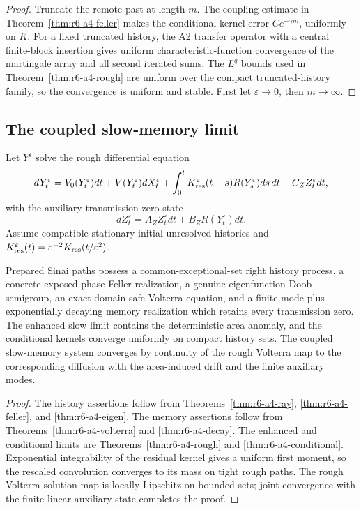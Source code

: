 \begin{proof}
Truncate the remote past at length \(m\).  The coupling estimate in
Theorem~\ref{thm:r6-a4-feller} makes the conditional-kernel error
\(Ce^{-\gamma m}\), uniformly on \(K\).  For a fixed truncated history, the
A2 transfer operator with a central finite-block insertion gives uniform
characteristic-function convergence of the martingale array and all second
iterated sums.  The \(L^q\) bounds used in
Theorem~\ref{thm:r6-a4-rough} are uniform over the compact truncated-history
family, so the convergence is uniform and stable.  First let
\(\varepsilon\to0\), then \(m\to\infty\).
\end{proof}

\subsection{The coupled slow-memory limit}

Let \(Y^\varepsilon\) solve the rough differential equation
\[
dY_t^\varepsilon=V_0(Y_t^\varepsilon)dt+
V(Y_t^\varepsilon)dX_t^\varepsilon+
\int_0^tK_{\rm res}^\varepsilon(t-s)R(Y_s^\varepsilon)ds\,dt
+C_ZZ_t^\varepsilon dt,
\]
with the auxiliary transmission-zero state
\[
dZ_t^\varepsilon=A_ZZ_t^\varepsilon dt+B_ZR(Y_t^\varepsilon)dt.
\]
Assume compatible stationary initial unresolved histories and
\(K_{\rm res}^\varepsilon(t)=\varepsilon^{-2}
K_{\rm res}(t/\varepsilon^2)\).

\begin{theorem}
\label{thm:r6-a4-main}
Prepared Sinai paths possess a common-exceptional-set right history process,
a concrete exposed-phase Feller realization, a genuine eigenfunction Doob
semigroup, an exact domain-safe Volterra equation, and a finite-mode plus
exponentially decaying memory realization which retains every transmission
zero.  The enhanced slow limit contains the deterministic area anomaly, and
the conditional kernels converge uniformly on compact history sets.  The
coupled slow-memory system converges by continuity of the rough Volterra map
to the corresponding diffusion with the area-induced drift and the finite
auxiliary modes.
\end{theorem}

\begin{proof}
The history assertions follow from Theorems~\ref{thm:r6-a4-ray},
\ref{thm:r6-a4-feller}, and \ref{thm:r6-a4-eigen}.  The memory assertions
follow from Theorems~\ref{thm:r6-a4-volterra} and
\ref{thm:r6-a4-decay}.  The enhanced and conditional limits are
Theorems~\ref{thm:r6-a4-rough} and
\ref{thm:r6-a4-conditional}.  Exponential integrability of the residual
kernel gives a uniform first moment, so the rescaled convolution converges to
its mass on tight rough paths.  The rough Volterra solution map is locally
Lipschitz on bounded sets; joint convergence with the finite linear auxiliary
state completes the proof.
\end{proof}
